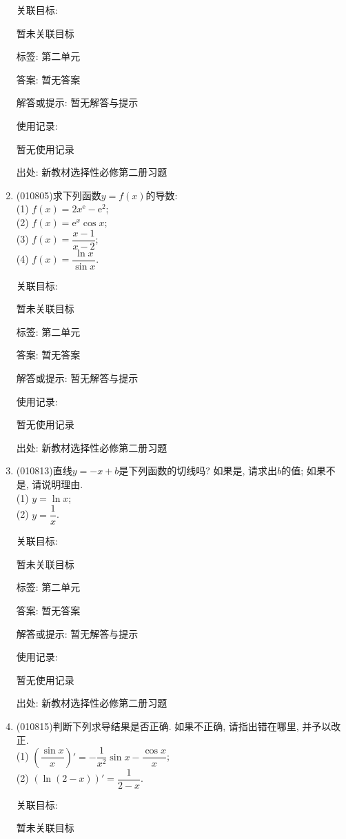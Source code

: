 \documentclass[10pt,a4paper]{article}
\begin{document}
\begin{enumerate}[1.]
关联目标:

暂未关联目标



标签: 第二单元

答案: 暂无答案

解答或提示: 暂无解答与提示

使用记录:

暂无使用记录


出处: 新教材选择性必修第二册习题
\item { (010805)}求下列函数$y=f(x)$的导数:\\
(1) $f(x)=2x^{\mathrm{e}}-\mathrm{e}^2$;\\
(2) $f(x)=\mathrm{e}^x\cos x$;\\
(3) $f(x)=\dfrac{x-1}{x-2}$;\\
(4) $f(x)=\dfrac{\ln x}{\sin x}$.


关联目标:

暂未关联目标



标签: 第二单元

答案: 暂无答案

解答或提示: 暂无解答与提示

使用记录:

暂无使用记录


出处: 新教材选择性必修第二册习题
\item { (010813)}直线$y=-x+b$是下列函数的切线吗? 如果是, 请求出$b$的值; 如果不是, 请说明理由.\\
(1) $y=\ln x$;\\
(2) $y=\dfrac 1x$.


关联目标:

暂未关联目标



标签: 第二单元

答案: 暂无答案

解答或提示: 暂无解答与提示

使用记录:

暂无使用记录


出处: 新教材选择性必修第二册习题
\item { (010815)}判断下列求导结果是否正确. 如果不正确, 请指出错在哪里, 并予以改正.\\
(1) $(\dfrac{\sin x}x)'=-\dfrac 1{x^2}\sin x-\dfrac{\cos x}x$;\\
(2) $(\ln (2-x))'=\dfrac 1{2-x}$.


关联目标:

暂未关联目标




\end{enumerate}
\end{document}
